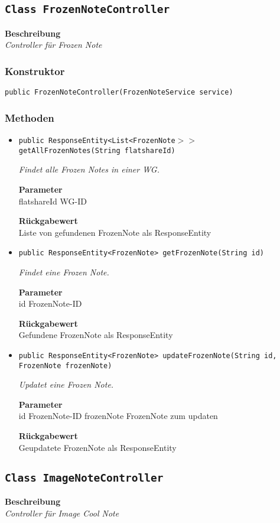     \subsection{\texttt{Class FrozenNoteController}}
    \textbf{Beschreibung} \\
    \textit{Controller für Frozen Note}
    \subsubsection*{Konstruktor}
    \texttt{public FrozenNoteController(FrozenNoteService service)}
    \subsubsection*{Methoden}
    \begin{itemize}
    	\item{\texttt{public ResponseEntity<List<FrozenNote$>>$ getAllFrozenNotes(String flatshareId)}}
    	
    	\textit{Findet alle Frozen Notes in einer WG.}
    	
    	\textbf{Parameter} \\
    	flatshareId WG-ID
    	
    	\textbf{Rückgabewert} \\
    	Liste von gefundenen FrozenNote als ResponseEntity        \item{\texttt{public ResponseEntity<FrozenNote> getFrozenNote(String id)}}
    	
    	\textit{Findet eine Frozen Note.}
    	
    	\textbf{Parameter} \\
    	id FrozenNote-ID
    	
    	\textbf{Rückgabewert} \\
    	Gefundene FrozenNote als ResponseEntity        \item{\texttt{public ResponseEntity<FrozenNote> updateFrozenNote(String id, FrozenNote frozenNote)}}
    	
    	\textit{Updatet eine Frozen Note.}
    	
    	\textbf{Parameter} \\
    	id FrozenNote-ID
    	frozenNote FrozenNote zum updaten
    	
    	\textbf{Rückgabewert} \\
    	Geupdatete FrozenNote als ResponseEntity
    \end{itemize}
    \subsection{\texttt{Class ImageNoteController}}
    \textbf{Beschreibung} \\
    \textit{Controller für Image Cool Note}
